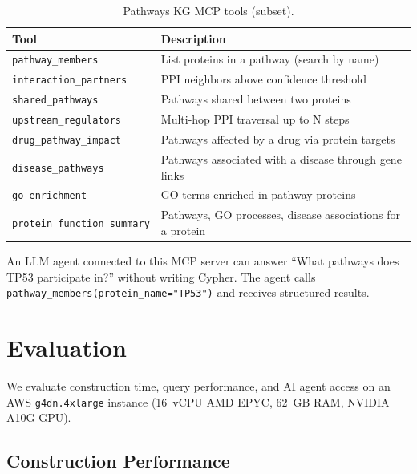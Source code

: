 \documentclass[11pt]{article}
\begin{document}
\begin{table}[H]
\centering
\caption{Pathways KG MCP tools (subset).}
\label{tab:mcp}
\small
\begin{tabular}{lp{7cm}}
\toprule
\textbf{Tool} & \textbf{Description} \\
\midrule
\texttt{pathway\_members} & List proteins in a pathway (search by name) \\
\texttt{interaction\_partners} & PPI neighbors above confidence threshold \\
\texttt{shared\_pathways} & Pathways shared between two proteins \\
\texttt{upstream\_regulators} & Multi-hop PPI traversal up to N steps \\
\texttt{drug\_pathway\_impact} & Pathways affected by a drug via protein targets \\
\texttt{disease\_pathways} & Pathways associated with a disease through gene links \\
\texttt{go\_enrichment} & GO terms enriched in pathway proteins \\
\texttt{protein\_function\_summary} & Pathways, GO processes, disease associations for a protein \\
\bottomrule
\end{tabular}
\end{table}

An LLM agent connected to this MCP server can answer ``What pathways does TP53 participate in?'' without writing Cypher. The agent calls \texttt{pathway\_members(protein\_name="TP53")} and receives structured results.

\section{Evaluation}

We evaluate construction time, query performance, and AI agent access on an AWS \texttt{g4dn.4xlarge} instance (16~vCPU AMD EPYC, 62~GB RAM, NVIDIA A10G GPU).

\subsection{Construction Performance}
\end{document}
